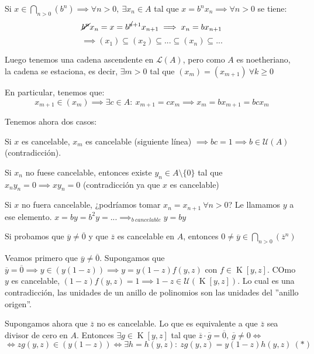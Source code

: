 \documentclass[openany]{book}
\begin{document}
\begin{exercise}$  $

    Si $ x \in \bigcap _{n>0} (b^{n}) \implies \forall  n > 0,\ \exists x_n \in A$ tal que $ x = b^{n}x_n \implies \forall  n > 0  $ se tiene:
    $$ \cancel{b^{n}}x_n = x = b^{\cancel{n}+1}x_{n+1} \implies x_n = bx_{n+1} $$
    $$ \implies (x_1) \subseteq  (x_2) \subseteq ... \subseteq (x_n) \subseteq ...  $$

    Luego tenemos una cadena ascendente en $ \mathcal{L}(A) $, pero como $ A $ es noetheriano, la cadena se estaciona, es decir, $ \exists m > 0 $ tal que $ (x_m) = (x_{m+1})\ \forall k \geq  0 $

    En particular, tenemos que:
    $$ x_{m+1} \in (x_{m}) \implies \exists c \in A:\ x_{m+1} = cx_{m} \implies x_{m} = b x_{m+1} = bcx_m $$

    Tenemos ahora dos casos:
    
    Si $ x $ es cancelable, $ x_m $ es cancelable (siguiente línea) $ \implies bc = 1 \implies b \in \mathcal{U}(A)$ (contradicción).
    
    Si $ x_n $ no fuese cancelable, entonces existe $ y_n \in A \setminus \{0\} $ tal que $ x_ny_n = 0 \implies xy_n = 0 $ (contradicción ya que $ x $ es cancelable)

    Si $ x $ no fuera cancelable, ¿podríamos tomar $ x_n = x_{n+1}\ \forall n > 0$? Le llamamos $ y $ a ese elemento. $ x = by = b^2 y = ... \implies_{b\ cancelable} y = by $

    
    Si probamos que $ \overline{y} \ne \overline{0} $ y que $ \overline{z} $ es cancelable en $ A $, entonces $ 0 \ne \overline{y} \in \bigcap_{n > 0}(\overline{z}^{n}) $

    Veamos primero que $ \overline{y} \ne \overline{0} $. Supongamos que $ \overline{y} = \overline{0} \implies y \in (y(1-z)) \implies y = y(1-z)f(y,z)$ con $ f \in \operatorname{K}[y,z] $. COmo $ y $ es cancelable, $ (1-z)f(y,z) = 1 \implies 1-z \in \mathcal{U}(\operatorname{K}[y,z]) $. Lo cual es una contradicción, las unidades de un anillo de polinomios son las unidades del ''anillo origen''.

    Supongamos ahora que $ \overline{z} $ no es cancelable. Lo que es equivalente a  que $ \overline{z} $ sea divisor de cero en $ A $. Entonces $ \exists g \in \operatorname{K}[y,z] $ tal que $ \overline{z}\cdot \overline{g} = \overline{0},\ \overline{g} \ne 0 \iff $
    $$ \iff zg(y,z) \in (y(1-z)) \iff \exists h = h(y,z):\ zg(y,z) = y(1-z)h(y,z)\ (*)$$


\end{exercise}
\end{document}
